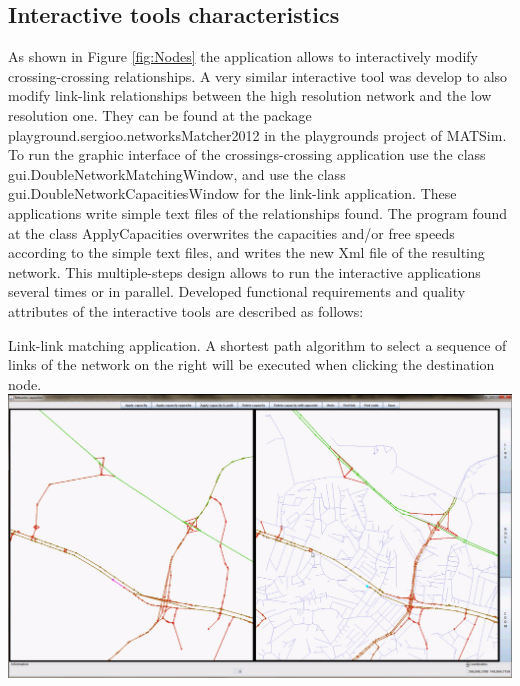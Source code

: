 \subsection{Interactive tools characteristics}
As shown in Figure \ref{fig:Nodes} the application allows to interactively modify crossing-crossing relationships. A very similar interactive tool was develop to also modify link-link relationships between the high resolution network and the low resolution one. They can be found at the package playground.sergioo.networksMatcher2012 in the playgrounds project of MATSim. To run the graphic interface of the crossings-crossing application use the class gui.DoubleNetworkMatchingWindow, and use the class gui.DoubleNetworkCapacitiesWindow for the link-link application. These applications write simple text files of the relationships found. The program found at the class ApplyCapacities overwrites the capacities and/or free speeds according to the simple text files, and writes the new Xml file of the resulting network. This multiple-steps design allows to run the interactive applications several times or in parallel. Developed functional requirements and quality attributes of the interactive tools are described as follows:

\createfigure
{}
{Link-link matching application. A shortest path algorithm to select a sequence of links of the network on the right will be executed when clicking the destination node.}
{\label{fig:Links}}
{\includegraphics[width=1.0\textwidth]{extending/figures/netEdSing/Links.png}}
{}


